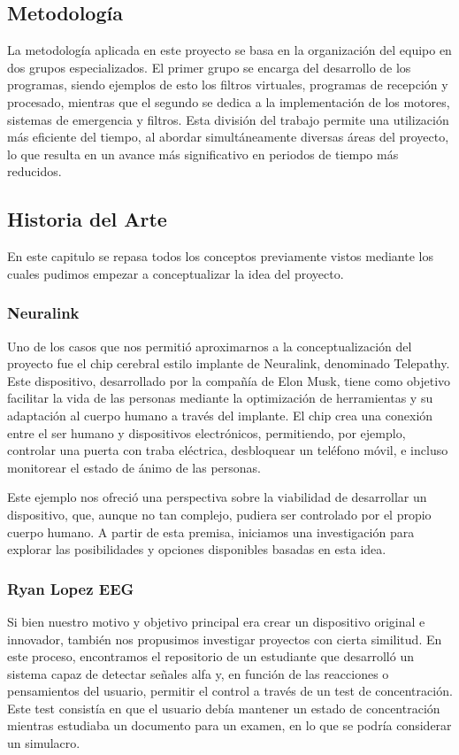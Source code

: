 \documentclass{article}
\begin{document}
\subsection{Metodología}
La metodología aplicada en este proyecto se basa en la organización del equipo en dos grupos especializados. El primer grupo se encarga del desarrollo de los programas, siendo ejemplos de esto los filtros virtuales, programas de recepción y procesado, mientras que el segundo se dedica a la implementación de los motores, sistemas de emergencia y filtros. Esta división del trabajo permite una utilización más eficiente del tiempo, al abordar simultáneamente diversas áreas del proyecto, lo que resulta en un avance más significativo en periodos de tiempo más reducidos.


\subsection{Historia del Arte}
En este capitulo se repasa todos los conceptos previamente vistos mediante los cuales pudimos empezar a conceptualizar la idea del proyecto.



\subsubsection{Neuralink}
Uno de los casos que nos permitió aproximarnos a la conceptualización del proyecto fue el chip cerebral estilo implante de Neuralink, denominado Telepathy. Este dispositivo, desarrollado por la compañía de Elon Musk, tiene como objetivo facilitar la vida de las personas mediante la optimización de herramientas y su adaptación al cuerpo humano a través del implante. El chip crea una conexión entre el ser humano y dispositivos electrónicos, permitiendo, por ejemplo, controlar una puerta con traba eléctrica, desbloquear un teléfono móvil, e incluso monitorear el estado de ánimo de las personas.


Este ejemplo nos ofreció una perspectiva sobre la viabilidad de desarrollar un dispositivo, que, aunque no tan complejo, pudiera ser controlado por el propio cuerpo humano. A partir de esta premisa, iniciamos una investigación para explorar las posibilidades y opciones disponibles basadas en esta idea.


\subsubsection{Ryan Lopez EEG}
Si bien nuestro motivo y objetivo principal era crear un dispositivo original e innovador, también nos propusimos investigar proyectos con cierta similitud. En este proceso, encontramos el repositorio de un estudiante que desarrolló un sistema capaz de detectar señales alfa y, en función de las reacciones o pensamientos del usuario, permitir el control a través de un test de concentración. Este test consistía en que el usuario debía mantener un estado de concentración mientras estudiaba un documento para un examen, en lo que se podría considerar un simulacro.
\end{document}
